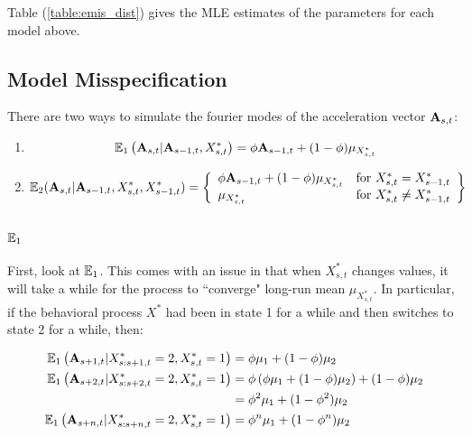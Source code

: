 Table (\ref{table:emis_dist}) gives the MLE estimates of the parameters for each model above.






\iffalse
\subsection{Model Misspecification}

There are two ways to simulate the fourier modes of the acceleration vector $\mathbf{A}_{s,t}$:

\begin{enumerate}
	\item $$\mathbb{E}_1\left(\mathbf{A}_{s,t} | \mathbf{A}_{s-1,t}, X^*_{s,t}\right) = \phi \mathbf{A}_{s-1,t} + (1-\phi) \mu_{X^*_{s,t}} $$
	
	\item $$\mathbb{E}_2(\mathbf{A}_{s,t} | \mathbf{A}_{s-1,t}, X^*_{s,t}, X^*_{s-1,t}) = \left\{\begin{array}{lr}
	\phi \mathbf{A}_{s-1,t} + (1-\phi) \mu_{X^*_{s,t}} & \text{for } X^*_{s,t} = X^*_{s-1,t}\\
	\mu_{X^*_{s,t}} & \text{for } X^*_{s,t} \neq X^*_{s-1,t}
	\end{array}\right\}$$
\end{enumerate}

\subsubsection{$\mathbb{E}_1$}

First, look at $\mathbb{E}_1$. This comes with an issue in that when $X^*_{s,t}$ changes values, it will take a while for the process to ``converge" long-run mean $\mu_{X^*_{s,t}}$. In particular, if the behavioral process $X^*$ had been in state 1 for a while and then switches to state 2 for a while, then:

\begin{align*}
	\mathbb{E}_1\left(\mathbf{A}_{s+1,t}|X^*_{s:s+1,t} = 2, X^*_{s,t} = 1\right) &=  \phi \mu_1 + (1-\phi) \mu_2 \\
	\mathbb{E}_1\left(\mathbf{A}_{s+2,t}|X^*_{s:s+2,t} = 2, X^*_{s,t} = 1\right) &= \phi\left( \phi \mu_1 + (1-\phi) \mu_2\right) + (1-\phi)\mu_2 \\
	&= \phi^2 \mu_1 + (1-\phi^2) \mu_2\\
	\mathbb{E}_1\left(\mathbf{A}_{s+n,t}|X^*_{s:s+n,t} = 2, X^*_{s,t} = 1\right) &=  \phi^n \mu_1 + (1-\phi^n) \mu_2 \\
\end{align*}

